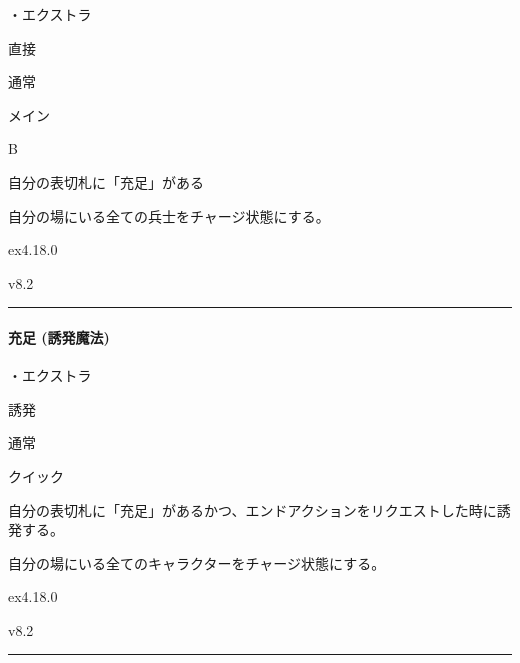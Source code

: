 \documentclass[letterpaper,10pt,dvipdfmx]{sphinxmanual}
\begin{document}
\sphinxAtStartPar
・エクストラ

\sphinxAtStartPar
{} 直接

\sphinxAtStartPar
{} 通常

\sphinxAtStartPar
{} メイン

\sphinxAtStartPar
{} B

\sphinxAtStartPar
{}

\sphinxAtStartPar
自分の表切札に「充足」がある

\sphinxAtStartPar
{}

\sphinxAtStartPar
自分の場にいる全ての兵士をチャージ状態にする。

\sphinxAtStartPar
{}  ex4.18.0

\sphinxAtStartPar
{}  v8.2


\bigskip\hrule\bigskip



\paragraph{充足 (誘発魔法)}
\label{\detokenize{auto/frameActionlist:act-satisfaction}}\label{\detokenize{auto/frameActionlist:id63}}
\sphinxAtStartPar
{}

\sphinxAtStartPar
・エクストラ

\sphinxAtStartPar
{} 誘発

\sphinxAtStartPar
{} 通常

\sphinxAtStartPar
{} クイック

\sphinxAtStartPar
{}

\sphinxAtStartPar
自分の表切札に「充足」があるかつ、エンドアクションをリクエストした時に誘発する。

\sphinxAtStartPar
{}

\sphinxAtStartPar
自分の場にいる全てのキャラクターをチャージ状態にする。

\sphinxAtStartPar
{}  ex4.18.0

\sphinxAtStartPar
{}  v8.2


\bigskip\hrule\bigskip
\end{document}
